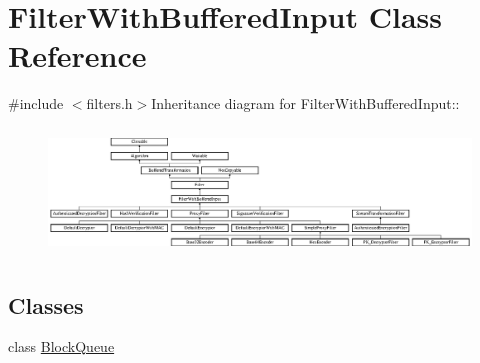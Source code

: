 \hypertarget{class_filter_with_buffered_input}{
\section{FilterWithBufferedInput Class Reference}
\label{class_filter_with_buffered_input}
}


{\ttfamily \#include $<$filters.h$>$}Inheritance diagram for FilterWithBufferedInput::\begin{figure}[H]
\begin{center}
\leavevmode
\includegraphics[height=3.40426cm]{class_filter_with_buffered_input}
\end{center}
\end{figure}
\subsection*{Classes}
\begin{DoxyCompactItemize}
\item 
class \hyperlink{class_filter_with_buffered_input_1_1_block_queue}{BlockQueue}
\end{DoxyCompactItemize}
